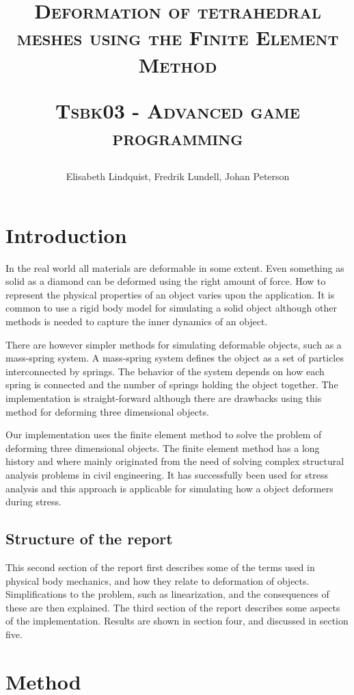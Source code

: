 \documentclass[10pt,a4paper]{article}
\author{Elisabeth Lindquist, Fredrik Lundell, Johan Peterson}
\title{\textsc{Deformation of tetrahedral meshes using the Finite Element Method}\\\begin{small}\textsc{Tsbk03 - Advanced game programming}\end{small}}
\begin{document}
\maketitle
\begin{abstract}

\end{abstract}
\pagebreak
\tableofcontents
\pagebreak

\section{Introduction}
In the real world all materials are deformable in some extent. Even something as solid as a diamond can be deformed using the right amount of force. How to represent the physical properties of an object varies upon the application. It is common to use a rigid body model for simulating a solid object although other methods is needed to capture the inner dynamics of an object. 

There are however simpler methods for simulating deformable objects, such as a mass-spring system. A mass-spring system defines the object as a set of particles interconnected by springs. The behavior of the system depends on how each spring is connected and the number of springs holding the object together. The implementation is straight-forward although there are drawbacks using this method for deforming three dimensional objects.

Our implementation uses the finite element method to solve the problem of deforming three dimensional objects. The finite element method has a long history and where mainly originated from the need of solving complex structural analysis problems in civil engineering. It has successfully been used for stress analysis and this approach is applicable for simulating how a object deformers during stress. 

\subsection{Structure of the report}
This second section of the report first describes some of the terms used in physical body mechanics, and how they relate to deformation of objects. Simplifications to the problem, such as linearization, and the consequences of these are then explained. The third section of the report describes some aspects of the implementation. Results are shown in section four, and discussed in section five. 

\section{Method}
\end{document}
